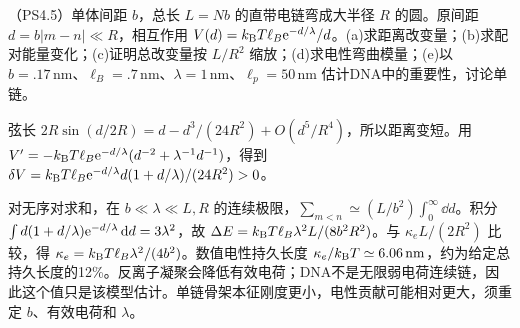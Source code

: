 \begin{exercise}
（PS4.5）单体间距 $b$，总长 $L=Nb$ 的直带电链弯成大半径 $R$ 的圆。原间距 $d=b|m-n|\ll R$，相互作用 $V(d)=k_{\mathrm B} T\ell_B\mathrm e^{-d/\lambda}/d$。(a)求距离改变量；(b)求配对能量变化；(c)证明总改变量按 $L/R^2$ 缩放；(d)求电性弯曲模量；(e)以 $b=.17\,\mathrm{nm}$、$\ell_B=.7\,\mathrm{nm}$、$\lambda=1\,\mathrm{nm}$、$\ell_p=50\,\mathrm{nm}$ 估计DNA中的重要性，讨论单链。
\end{exercise}
\begin{solution}
弦长 $2R\sin(d/2R)=d-d^3/(24R^2)+O(d^5/R^4)$，所以距离变短。用 $V'=-k_{\mathrm B} T\ell_B\mathrm e^{-d/\lambda}(d^{-2}+\lambda^{-1}d^{-1})$，得到 $\delta V=k_{\mathrm B} T\ell_B\mathrm e^{-d/\lambda}d(1+d/\lambda)/(24R^2)>0$。

对无序对求和，在 $b\ll\lambda\ll L,R$ 的连续极限，$\sum_{m<n}\simeq(L/b^2)\int_0^\infty\dd d$。积分 $\int d(1+d/\lambda)\mathrm e^{-d/\lambda}\,\mathrm d d=3\lambda^2$，故 $\Delta E=k_{\mathrm B} T\ell_B\lambda^2L/(8b^2R^2)$。与 $\kappa_e L/(2R^2)$ 比较，得 $\kappa_e=k_{\mathrm B} T\ell_B\lambda^2/(4b^2)$。数值电性持久长度 $\kappa_e/k_{\mathrm B} T\simeq6.06\,\mathrm{nm}$，约为给定总持久长度的12\%。反离子凝聚会降低有效电荷；DNA不是无限弱电荷连续链，因此这个值只是该模型估计。单链骨架本征刚度更小，电性贡献可能相对更大，须重定 $b$、有效电荷和 $\lambda$。
\end{solution}

